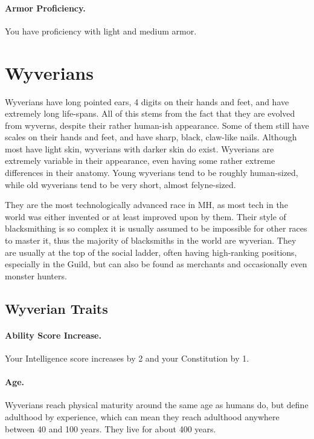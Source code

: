 \paragraph{Armor Proficiency.} You have proficiency with light and medium armor.


\section{Wyverians}


Wyverians have long pointed ears, 4 digits on their hands and feet, and have extremely long life-spans. All of this stems from the fact that they are evolved from wyverns, despite their rather human-ish appearance.  Some of them still have scales on their hands and feet, and have sharp, black, claw-like nails. Although most have light skin, wyverians with darker skin do exist. Wyverians are extremely variable in their appearance, even having some rather extreme differences in their anatomy.  Young wyverians tend to be roughly human-sized, while old wyverians tend to be very short, almost felyne-sized.

They are the most technologically advanced race in MH, as most tech in the world was either invented or at least improved upon by them. Their style of blacksmithing is so complex it is usually assumed to be impossible for other races to master it, thus the majority of blacksmiths in the world are wyverian. They are usually at the top of the social ladder, often having high-ranking positions, especially in the Guild, but can also be found as merchants and occasionally even monster hunters.

\subsection*{Wyverian Traits}
\paragraph{Ability Score Increase.} Your Intelligence score increases by 2 and your Constitution by 1.

\paragraph{Age.} Wyverians reach physical maturity around the same age as humans do, but define adulthood by experience, which can mean they reach adulthood anywhere between 40 and 100 years. They live for about 400 years.

